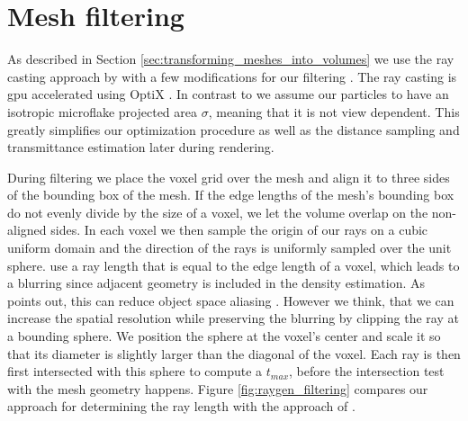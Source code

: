 \section{Mesh filtering}
\label{sec:mesh_filtering}
As described in Section \ref{sec:transforming_meshes_into_volumes} we use the ray casting approach by \citeauthor{hybrid_mesh_volume_lods} with a few modifications for our filtering \cite{hybrid_mesh_volume_lods}.
The ray casting is \ac{gpu} accelerated using OptiX \cite{parker_optix}.
In contrast to \citeauthor{hybrid_mesh_volume_lods} we assume our particles to have an isotropic microflake projected area $\sigma$, meaning that it is not view dependent.
This greatly simplifies our optimization procedure as well as the distance sampling and transmittance estimation later during rendering.

During filtering we place the voxel grid over the mesh and align it to three sides of the bounding box of the mesh.
If the edge lengths of the mesh's bounding box do not evenly divide by the size of a voxel, we let the volume overlap on the non-aligned sides.
In each voxel we then sample the origin of our rays on a cubic uniform domain and the direction of the rays is uniformly sampled over the unit sphere.
\citeauthor{hybrid_mesh_volume_lods} use a ray length that is equal to the edge length of a voxel, which leads to a blurring since adjacent geometry is included in the density estimation.
As \citeauthor{wang_object_space_aliasing} points out, this can reduce object space aliasing \cite{wang_object_space_aliasing}.
However we think, that we can increase the spatial resolution while preserving the blurring by clipping the ray at a bounding sphere.
We position the sphere at the voxel's center and scale it so that its diameter is slightly larger than the diagonal of the voxel.
Each ray is then first intersected with this sphere to compute a $t_{max}$, before the intersection test with the mesh geometry happens.
Figure \ref{fig:raygen_filtering} compares our approach for determining the ray length with the approach of \citeauthor{hybrid_mesh_volume_lods}.
